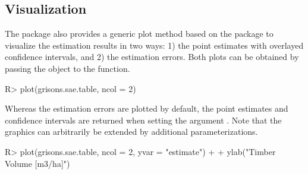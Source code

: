 \subsection{Visualization}

The  package also provides a  generic plot method based on the  package \citep{ggplot2} to visualize the estimation results in two ways: 1) the point estimates with overlayed confidence intervals, and 2) the estimation errors. Both plots can be obtained by passing the  object to the  function.

\begin{small}
\begin{Schunk}
\begin{Sinput}
R> plot(grisons.sae.table, ncol = 2)
\end{Sinput}
\end{Schunk}
\end{small}

\begin{figure}[h]
\centering
{}
\end{figure}

\newpage

Whereas the estimation errors are plotted by default, the point estimates and confidence intervals are returned when setting the argument . Note that the graphics can arbitrarily be extended by additional  parameterizations.

\begin{small}
\begin{Schunk}
\begin{Sinput}
R> plot(grisons.sae.table, ncol = 2, yvar = "estimate") +
+    ylab("Timber Volume [m3/ha]")
\end{Sinput}
\end{Schunk}
\end{small}

